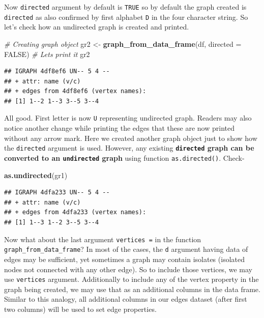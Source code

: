 \documentclass[
]{book}
\newenvironment{Shaded}{\begin{snugshade}}{\end{snugshade}}
\newcommand{\AttributeTok}[1]{\textcolor[rgb]{0.13,0.29,0.53}{#1}}
\newcommand{\CommentTok}[1]{\textcolor[rgb]{0.56,0.35,0.01}{\textit{#1}}}
\newcommand{\ConstantTok}[1]{\textcolor[rgb]{0.56,0.35,0.01}{#1}}
\newcommand{\FunctionTok}[1]{\textcolor[rgb]{0.13,0.29,0.53}{\textbf{#1}}}
\newcommand{\NormalTok}[1]{#1}
\newcommand{\OtherTok}[1]{\textcolor[rgb]{0.56,0.35,0.01}{#1}}
\begin{document}
Now \texttt{directed} argument by default is \texttt{TRUE} so by default the graph created is \texttt{directed} as also confirmed by first alphabet \texttt{D} in the four character string. So let's check how an undirected graph is created and printed.

\begin{Shaded}
\begin{Highlighting}[]
\CommentTok{\# Creating graph object}
\NormalTok{gr2 }\OtherTok{\textless{}{-}} \FunctionTok{graph\_from\_data\_frame}\NormalTok{(df, }\AttributeTok{directed =} \ConstantTok{FALSE}\NormalTok{)}
\CommentTok{\# Let\textquotesingle{}s print it}
\NormalTok{gr2}
\end{Highlighting}
\end{Shaded}

\begin{verbatim}
## IGRAPH 4df8ef6 UN-- 5 4 -- 
## + attr: name (v/c)
## + edges from 4df8ef6 (vertex names):
## [1] 1--2 1--3 3--5 3--4
\end{verbatim}

All good. First letter is now \texttt{U} representing undirected graph. Readers may also notice another change while printing the edges that these are now printed without any arrow mark. Here we created another graph object just to show how the \texttt{directed} argument is used. However, any existing \textbf{\texttt{directed} graph can be converted to an \texttt{undirected} graph} using function \texttt{as.directed()}. Check-

\begin{Shaded}
\begin{Highlighting}[]
\FunctionTok{as.undirected}\NormalTok{(gr1)}
\end{Highlighting}
\end{Shaded}

\begin{verbatim}
## IGRAPH 4dfa233 UN-- 5 4 -- 
## + attr: name (v/c)
## + edges from 4dfa233 (vertex names):
## [1] 1--3 1--2 3--5 3--4
\end{verbatim}

Now what about the last argument \texttt{vertices\ =} in the function \texttt{graph\_from\_data\_frame}? In most of the cases, the \texttt{d} argument having data of edges may be sufficient, yet sometimes a graph may contain isolates (isolated nodes not connected with any other edge). So to include those vertices, we may use \texttt{vertices} argument. Additionally to include any of the vertex property in the graph being created, we may use that as an additional columns in the data frame. Similar to this analogy, all additional columns in our edges dataset (after first two columns) will be used to set edge properties.
\end{document}
